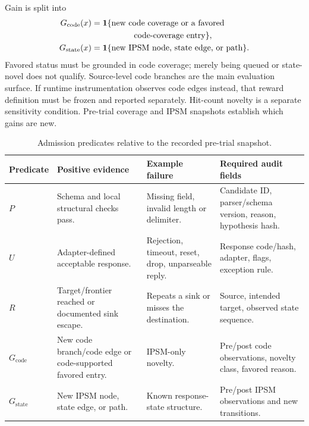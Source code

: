 \documentclass[final,5p,times,number]{elsarticle}
\newcommand{\gcode}{G_{\mathrm{code}}}
\newcommand{\gstate}{G_{\mathrm{state}}}
\begin{document}
Gain is split into
\begin{align}
\gcode(x)&=\mathbf{1}\{\text{new code coverage or a favored}\nonumber\\
&\hspace{18mm}\text{code-coverage entry}\},\label{eq:gcode}\\
\gstate(x)&=\mathbf{1}\{\text{new IPSM node, state edge, or path}\}.\label{eq:gstate}
\end{align}
Favored status must be grounded in code coverage; merely being queued or state-novel does not qualify. Source-level code branches are the main evaluation surface. If runtime instrumentation observes code edges instead, that reward definition must be frozen and reported separately. Hit-count novelty is a separate sensitivity condition. Pre-trial coverage and IPSM snapshots establish which gains are new.

\begin{table}[!tp]
\centering\small
\caption{Admission predicates relative to the recorded pre-trial snapshot.}
\label{tab:predicates}
\begin{tabularx}{\textwidth}{l Y Y Y}
\toprule
Predicate & Positive evidence & Example failure & Required audit fields \\
\midrule
$P$ & Schema and local structural checks pass. & Missing field, invalid length or delimiter. & Candidate ID, parser/schema version, reason, hypothesis hash. \\
$U$ & Adapter-defined acceptable response. & Rejection, timeout, reset, drop, unparseable reply. & Response code/hash, adapter, flags, exception rule. \\
$R$ & Target/frontier reached or documented sink escape. & Repeats a sink or misses the destination. & Source, intended target, observed state sequence. \\
$\gcode$ & New code branch/code edge or code-supported favored entry. & IPSM-only novelty. & Pre/post code observations, novelty class, favored reason. \\
$\gstate$ & New IPSM node, state edge, or path. & Known response-state structure. & Pre/post IPSM observations and new transitions. \\
\bottomrule
\end{tabularx}
\end{table}
\end{document}
